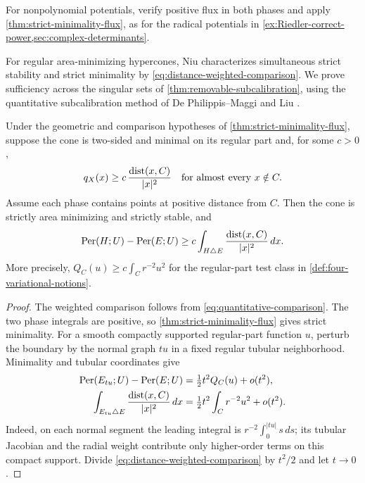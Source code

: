 For nonpolynomial potentials, verify positive flux in both phases and
apply \cref{thm:strict-minimality-flux}, as for the radical potentials in
\cref{ex:Riedler-correct-power,sec:complex-determinants}.

For regular area-minimizing hypercones, Niu \cite[Theorem~3]{Niu26}
characterizes simultaneous strict stability and strict minimality by
\eqref{eq:distance-weighted-comparison}. We prove sufficiency across
the singular sets of \cref{thm:removable-subcalibration}, using the
quantitative subcalibration method of De Philippis--Maggi
\cite[Section~4]{DePhilippisMaggi14} and Liu
\cite[Section~2.2]{Liu19}.

\begin{proposition}
\label{prop:distance-weighted-comparison}
Under the geometric and comparison hypotheses of
\cref{thm:strict-minimality-flux}, suppose the cone is two-sided and minimal on its regular part and, for some \(c>0\),
\begin{equation}\label{eq:linear-distance-divergence}
 q_X(x)\geq c\,\frac{\operatorname{dist}(x,C)}{|x|^2}
 \quad\text{for almost every }x\notin C.
\end{equation}
Assume each phase contains points at positive distance from \(C\).
Then the cone is strictly area minimizing and strictly stable, and
\begin{equation}\label{eq:distance-weighted-comparison}
 \operatorname{Per}(H;U)-\operatorname{Per}(E;U)
 \geq c\int_{H\triangle E}\frac{\operatorname{dist}(x,C)}{|x|^2}\,dx.
\end{equation}
More precisely, \(Q_C(u)\geq c\int_Cr^{-2}u^2\) for the regular-part
test class in \cref{def:four-variational-notions}.
\end{proposition}

\begin{proof}
The weighted comparison follows from
\eqref{eq:quantitative-comparison}. The two phase integrals are
positive, so \cref{thm:strict-minimality-flux} gives strict minimality.
For a smooth compactly supported regular-part function \(u\), perturb the
boundary by the normal graph \(tu\) in a fixed regular tubular neighborhood.
Minimality and tubular coordinates give
\begin{align*}
 \operatorname{Per}(E_{tu};U)-\operatorname{Per}(E;U)&=\tfrac12t^2Q_C(u)+o(t^2),\\
 \int_{E_{tu}\triangle E}\frac{\operatorname{dist}(x,C)}{|x|^2}\,dx
 &=\tfrac12t^2\int_Cr^{-2}u^2+o(t^2).
\end{align*}
Indeed, on each normal segment the leading integral is
\(r^{-2}\int_0^{|tu|}s\,ds\); its tubular Jacobian and the radial weight
contribute only higher-order terms on this compact support.
Divide \eqref{eq:distance-weighted-comparison} by \(t^2/2\) and let
\(t\to0\).
\end{proof}

